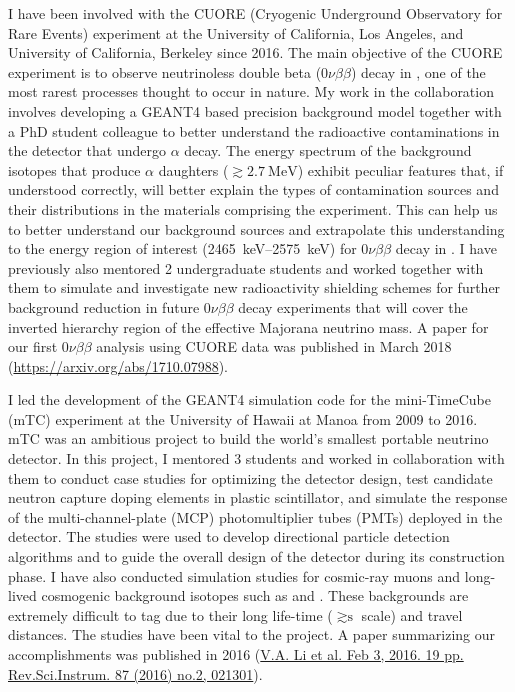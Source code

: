 \documentclass[11pt]{article} %
\begin{document}
I have been involved with the CUORE (Cryogenic Underground Observatory for Rare
Events) experiment at the University of California, Los Angeles, and University
of California, Berkeley since 2016. The main objective of the CUORE experiment
is to observe neutrinoless double beta ($0\nu\beta\beta$) decay in
, one of the most rarest processes thought to occur in nature. My
work in the collaboration involves developing a GEANT4 based precision
background model together with a PhD student colleague to better understand the
radioactive contaminations in the detector that undergo $\alpha$ decay. The
energy spectrum of the background isotopes that produce $\alpha$ daughters
($\gtrsim \SI{2.7}{\mega\electronvolt}$) exhibit peculiar features that, if
understood correctly, will better explain the types of contamination sources
and their distributions in the materials comprising the experiment. This can
help us to better understand our background sources and extrapolate this
understanding to the energy region of interest
(\SIrange{2465}{2575}{\kilo\electronvolt}) for $0\nu\beta\beta$ decay in
. I have previously also mentored 2 undergraduate students and
worked together with them to simulate and investigate new radioactivity
shielding schemes for further background reduction in future $0\nu\beta\beta$
decay experiments that will cover the inverted hierarchy region of the
effective Majorana neutrino mass. A paper for our first $0\nu\beta\beta$
analysis using CUORE data was published in March 2018
(\href{https://arxiv.org/abs/1710.07988}{https://arxiv.org/abs/1710.07988}).

I led the development of the GEANT4 simulation code for the
mini-TimeCube (mTC) experiment at the University of Hawaii at Manoa from 2009
to 2016. mTC was an ambitious project to build the world's smallest portable
neutrino detector. In this project, I mentored 3 students and worked in
collaboration with them to conduct case studies for optimizing the detector
design, test candidate neutron capture doping elements in plastic scintillator,
and simulate the response of the multi-channel-plate (MCP) photomultiplier
tubes (PMTs) deployed in the detector. The studies were used to develop
directional particle detection algorithms and to guide the overall design of the
detector during its construction phase. I have also conducted simulation
studies for cosmic-ray muons and long-lived cosmogenic background isotopes such
as  and . These backgrounds are extremely difficult to
tag due to their long life-time ($\gtrsim \si{\second}$ scale) and travel
distances. The studies have been vital to the project. A paper summarizing our
accomplishments was published in 2016
(\href{https://arxiv.org/abs/1602.01405}{V.A. Li et al. Feb 3, 2016. 19 pp.
Rev.Sci.Instrum. 87 (2016) no.2, 021301}).
\end{document}

